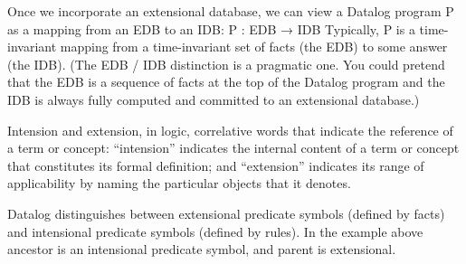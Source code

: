 \documentclass[11pt]{article}
\begin{document}
Once we incorporate an extensional database, we can view a Datalog program P as a mapping from an EDB to an IDB:
P : EDB → IDB
Typically, P is a time-invariant mapping from a time-invariant set of facts
(the EDB) to some answer (the IDB).
(The EDB / IDB distinction is a pragmatic one. You could pretend that the
EDB is a sequence of facts at the top of the Datalog program and the IDB is
always fully computed and committed to an extensional database.)

Intension and extension, in logic, correlative words that indicate the reference
of a term or concept: “intension” indicates the internal content of a term or
concept that constitutes its formal definition; and “extension” indicates its
range of applicability by naming the particular objects that it denotes.


Datalog distinguishes between extensional predicate symbols (defined by facts)
and intensional predicate symbols (defined by rules). In the example above
ancestor is an intensional predicate symbol, and parent is extensional.


\fi
\end{document}
